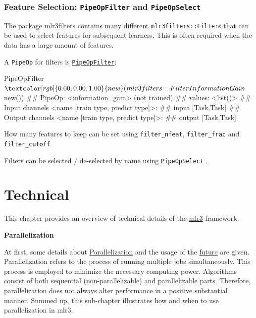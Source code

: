 \documentclass[]{article}
\newenvironment{Shaded}{}{}
\newcommand{\KeywordTok}[1]{\textcolor[rgb]{0.00,0.00,1.00}{#1}}
\newcommand{\NormalTok}[1]{#1}
\newcommand{\OperatorTok}[1]{#1}
\renewenvironment{Shaded} {\begin{snugshade}\small} {\end{snugshade}}
\begin{document}
\hypertarget{feature-selection-pipeopfilter-and-pipeopselect}{%
\subsubsection{\texorpdfstring{Feature Selection: \texttt{PipeOpFilter} and \texttt{PipeOpSelect}}{Feature Selection: PipeOpFilter and PipeOpSelect}}\label{feature-selection-pipeopfilter-and-pipeopselect}}

The package \href{https://mlr3filters.mlr-org.com}{mlr3filters} contains many different \href{https://mlr3filters.mlr-org.com/reference/Filter.html}{\texttt{mlr3filters::Filter}}s that can be used to select features for subsequent learners.
This is often required when the data has a large amount of features.

A \texttt{PipeOp} for filters is \href{https://mlr3pipelines.mlr-org.com/reference/mlr_pipeops_filter.html}{\texttt{PipeOpFilter}}:

\begin{Shaded}
\begin{Highlighting}[]
\NormalTok{PipeOpFilter}\OperatorTok{$}\KeywordTok{new}\NormalTok{(mlr3filters}\OperatorTok{::}\NormalTok{FilterInformationGain}\OperatorTok{$}\KeywordTok{new}\NormalTok{())}
\NormalTok{## PipeOp: <information_gain> (not trained)}
\NormalTok{## values: <list()>}
\NormalTok{## Input channels <name [train type, predict type]>:}
\NormalTok{##   input [Task,Task]}
\NormalTok{## Output channels <name [train type, predict type]>:}
\NormalTok{##   output [Task,Task]}
\end{Highlighting}
\end{Shaded}

How many features to keep can be set using \texttt{filter\_nfeat}, \texttt{filter\_frac} and \texttt{filter\_cutoff}.

Filters can be selected / de-selected by name using \href{https://mlr3pipelines.mlr-org.com/reference/mlr_pipeops_select.html}{\texttt{PipeOpSelect}} .

\hypertarget{technical}{%
\section{Technical}\label{technical}}

This chapter provides an overview of technical details of the \href{https://mlr3.mlr-org.com}{mlr3} framework.

\textbf{Parallelization}

At first, some details about \protect\hyperlink{parallelization}{Parallelization} and the usage of the \href{https://cran.r-project.org/package=future}{future} are given.
Parallelization refers to the process of running multiple jobs simultaneously.
This process is employed to minimize the necessary computing power.
Algorithms consist of both sequential (non-parallelizable) and parallelizable parts.
Therefore, parallelization does not always alter performance in a positive substantial manner.
Summed up, this sub-chapter illustrates how and when to use parallelization in mlr3.
\end{document}
